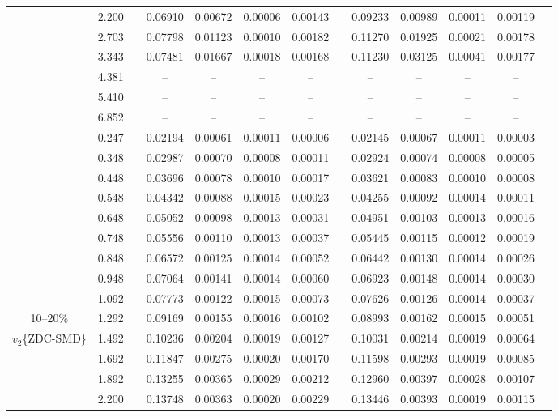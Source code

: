 \documentclass[aps,prc,superscriptaddress,showpacs,floatfix,twocolumn]{revtex4}
\begin{document}
\begin{table}[htbp]
\begin{ruledtabular}
\begin{tabular}{c|cccccccccccc}
 & 2.200 && 0.06910 & 0.00672 & 0.00006 & 0.00143 & & 0.09233 & 0.00989 & 0.00011 & 0.00119 \\ 
 & 2.703 && 0.07798 & 0.01123 & 0.00010 & 0.00182 & & 0.11270 & 0.01925 & 0.00021 & 0.00178 \\ 
 & 3.343 && 0.07481 & 0.01667 & 0.00018 & 0.00168 & & 0.11230 & 0.03125 & 0.00041 & 0.00177 \\ 
 & 4.381 && -- & -- & -- & -- & & -- & -- & -- & -- \\ 
 & 5.410 && -- & -- & -- & -- & & -- & -- & -- & -- \\ 
 & 6.852 && -- & -- & -- & -- & & -- & -- & -- & -- \\ 
\hline
 & 0.247 && 0.02194 & 0.00061 & 0.00011 & 0.00006 & & 0.02145 & 0.00067 & 0.00011 & 0.00003 \\ 
 & 0.348 && 0.02987 & 0.00070 & 0.00008 & 0.00011 & & 0.02924 & 0.00074 & 0.00008 & 0.00005 \\ 
 & 0.448 && 0.03696 & 0.00078 & 0.00010 & 0.00017 & & 0.03621 & 0.00083 & 0.00010 & 0.00008 \\ 
 & 0.548 && 0.04342 & 0.00088 & 0.00015 & 0.00023 & & 0.04255 & 0.00092 & 0.00014 & 0.00011 \\ 
 & 0.648 && 0.05052 & 0.00098 & 0.00013 & 0.00031 & & 0.04951 & 0.00103 & 0.00013 & 0.00016 \\ 
 & 0.748 && 0.05556 & 0.00110 & 0.00013 & 0.00037 & & 0.05445 & 0.00115 & 0.00012 & 0.00019 \\ 
 & 0.848 && 0.06572 & 0.00125 & 0.00014 & 0.00052 & & 0.06442 & 0.00130 & 0.00014 & 0.00026 \\ 
 & 0.948 && 0.07064 & 0.00141 & 0.00014 & 0.00060 & & 0.06923 & 0.00148 & 0.00014 & 0.00030 \\ 
 & 1.092 && 0.07773 & 0.00122 & 0.00015 & 0.00073 & & 0.07626 & 0.00126 & 0.00014 & 0.00037 \\ 
10--20\%
 & 1.292 && 0.09169 & 0.00155 & 0.00016 & 0.00102 & & 0.08993 & 0.00162 & 0.00015 & 0.00051 \\ 
$v_2$\{ZDC-SMD\}
 & 1.492 && 0.10236 & 0.00204 & 0.00019 & 0.00127 & & 0.10031 & 0.00214 & 0.00019 & 0.00064 \\ 
 & 1.692 && 0.11847 & 0.00275 & 0.00020 & 0.00170 & & 0.11598 & 0.00293 & 0.00019 & 0.00085 \\ 
 & 1.892 && 0.13255 & 0.00365 & 0.00029 & 0.00212 & & 0.12960 & 0.00397 & 0.00028 & 0.00107 \\ 
 & 2.200 && 0.13748 & 0.00363 & 0.00020 & 0.00229 & & 0.13446 & 0.00393 & 0.00019 & 0.00115 \\ 

\end{tabular}
\end{ruledtabular}
\end{table}
\end{document}
